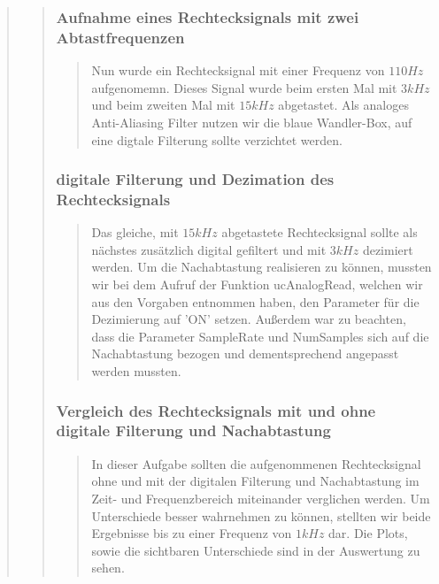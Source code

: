 \begin{quote}
\begin{quote}
\begin{quote}
			\end{quote}
			
			\subsubsection{Aufnahme eines Rechtecksignals mit zwei Abtastfrequenzen}
			\begin{quote}
			
			Nun wurde ein Rechtecksignal mit einer Frequenz von $110 Hz$ aufgenomemn.
			Dieses Signal wurde beim ersten Mal mit $3 kHz$ und beim zweiten Mal mit $15
			kHz$ abgetastet. Als analoges Anti-Aliasing Filter nutzen wir die blaue
			Wandler-Box, auf eine digtale Filterung sollte verzichtet werden.  
			
			\end{quote}			
			
			\subsubsection{digitale Filterung und Dezimation des Rechtecksignals}
			\begin{quote}
			
			Das gleiche, mit $15 kHz$ abgetastete Rechtecksignal sollte als nächstes
			zusätzlich digital gefiltert und mit $3 kHz$ dezimiert werden. Um die
			Nachabtastung realisieren zu können, mussten wir bei dem Aufruf der Funktion
			ucAnalogRead, welchen wir aus den Vorgaben entnommen haben, den Parameter für
			die Dezimierung auf 'ON' setzen. Außerdem war zu beachten, dass die Parameter
			SampleRate und NumSamples sich auf die Nachabtastung bezogen und
			dementsprechend angepasst werden mussten. 
			
			\end{quote}
			
			\subsubsection{Vergleich des Rechtecksignals mit und ohne digitale Filterung
			und Nachabtastung} 
			\begin{quote}
			
			In dieser Aufgabe sollten die aufgenommenen Rechtecksignal ohne und mit der
			digitalen Filterung und Nachabtastung im Zeit- und Frequenzbereich
			miteinander verglichen werden. Um Unterschiede besser wahrnehmen zu können,
			stellten wir beide Ergebnisse bis zu einer Frequenz von $1 kHz$ dar. Die
			Plots, sowie die sichtbaren Unterschiede sind in der Auswertung zu sehen. 
			

\end{quote}
\end{quote}
\end{quote}
